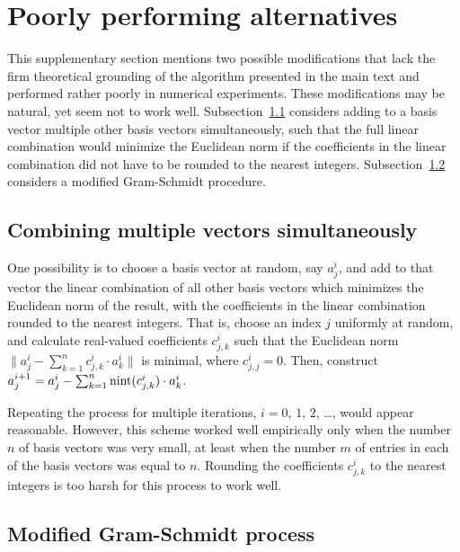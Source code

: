 \documentclass[supplement,hidelinks,onefignum,onetabnum]{siamart220329}
\begin{document}
\maketitle



\section{Poorly performing alternatives}
\label{poor}

This supplementary section mentions two possible modifications that lack
the firm theoretical grounding of the algorithm presented in the main text
and performed rather poorly in numerical experiments.
These modifications may be natural, yet seem not to work well.
Subsection~\ref{multiple} considers adding to a basis vector
multiple other basis vectors simultaneously,
such that the full linear combination would minimize the Euclidean norm
if the coefficients in the linear combination did not have to be rounded
to the nearest integers.
Subsection~\ref{modified} considers a modified Gram-Schmidt procedure.

\subsection{Combining multiple vectors simultaneously}
\label{multiple}

One possibility is to choose a basis vector at random, say $a^i_j$,
and add to that vector the linear combination of all other basis vectors
which minimizes the Euclidean norm of the result, with the coefficients
in the linear combination rounded to the nearest integers.
That is, choose an index $j$ uniformly at random,
and calculate real-valued coefficients $c^i_{j,k}$ such that the Euclidean norm
$\| a^i_j - \sum_{k=1}^n c^i_{j,k} \cdot a^i_k \|$ is minimal,
where $c^i_{j,j} = 0$. Then, construct
$a^{i+1}_j = a^i_j - \sum_{k=1}^n \operatorname{nint}(c^i_{j,k}) \cdot a^i_k$.

Repeating the process for multiple iterations, $i = 0$, $1$, $2$, \dots,
would appear reasonable. However, this scheme worked well empirically only
when the number $n$ of basis vectors was very small, at least
when the number $m$ of entries in each of the basis vectors was equal to $n$.
Rounding the coefficients $c^i_{j,k}$ to the nearest integers is too harsh
for this process to work well.

\subsection{Modified Gram-Schmidt process}
\label{modified}
\end{document}
